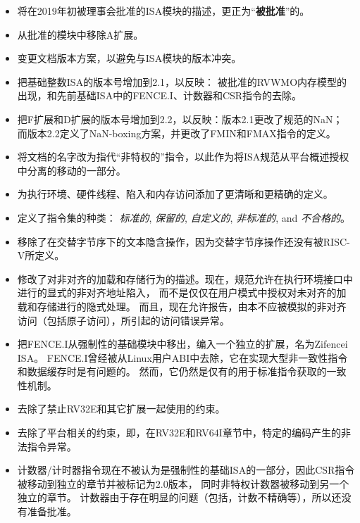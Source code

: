\vspace{-0.2in}
\begin{itemize}
\parskip 0pt
\itemsep 1pt
\item 将在2019年初被理事会批准的ISA模块的描述，更正为“{\bf 被批准}”的。

\item 从批准的模块中移除A扩展。

\item 变更文档版本方案，以避免与ISA模块的版本冲突。

\item 把基础整数ISA的版本号增加到2.1，以反映：
  被批准的RVWMO内存模型的出现，和先前基础ISA中的FENCE.I、计数器和CSR指令的去除。

\item 把F扩展和D扩展的版本号增加到2.2，以反映：版本2.1更改了规范的NaN；
而版本2.2定义了NaN-boxing方案，并更改了FMIN和FMAX指令的定义。

\item 将文档的名字改为指代“非特权的”指令，以此作为将ISA规范从平台概述授权中分离的移动的一部分。

\item 为执行环境、硬件线程、陷入和内存访问添加了更清晰和更精确的定义。

\item 定义了指令集的种类： {\em 标准的}, {\em 保留的}, {\em 自定义的}, {\em 非标准的}, and {\em 不合格的}。

\item 移除了在交替字节序下的文本隐含操作，因为交替字节序操作还没有被RISC-V所定义。

\item 修改了对非对齐的加载和存储行为的描述。现在，规范允许在执行环境接口中进行的显式的非对齐地址陷入，
而不是仅仅在用户模式中授权对未对齐的加载和存储进行的隐式处理。
而且，现在允许报告，由本不应被模拟的非对齐访问（包括原子访问），所引起的访问错误异常。

\item 把FENCE.I从强制性的基础模块中移出，编入一个独立的扩展，名为Zifencei ISA。
FENCE.I曾经被从Linux用户ABI中去除，它在实现大型非一致性指令和数据缓存时是有问题的。
然而，它仍然是仅有的用于标准指令获取的一致性机制。

\item 去除了禁止RV32E和其它扩展一起使用的约束。

\item 去除了平台相关的约束，即，在RV32E和RV64I章节中，特定的编码产生的非法指令异常。

\item 计数器/计时器指令现在不被认为是强制性的基础ISA的一部分，因此CSR指令被移动到独立的章节并被标记为2.0版本，
同时非特权计数器被移动到另一个独立的章节。
计数器由于存在明显的问题（包括，计数不精确等），所以还没有准备批准。


\end{itemize}
